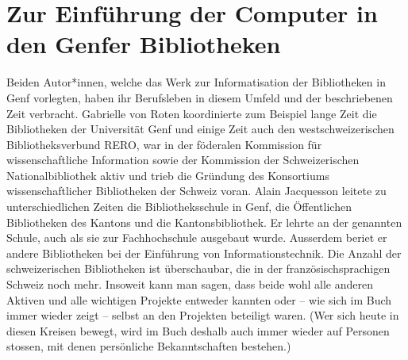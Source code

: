 \documentclass[a4paper,
fontsize=11pt,
oneside,
numbers=noperiodatend,
parskip=half-,
bibliography=totoc,
final
]{scrartcl}
\begin{document}
\hypertarget{zur-einfuxfchrung-der-computer-in-den-genfer-bibliotheken}{%
\section{Zur Einführung der Computer in den Genfer
Bibliotheken}\label{zur-einfuxfchrung-der-computer-in-den-genfer-bibliotheken}}

Beiden Autor*innen, welche das Werk zur Informatisation der Bibliotheken
in Genf vorlegten, haben ihr Berufsleben in diesem Umfeld und der
beschriebenen Zeit verbracht. Gabrielle von Roten koordinierte zum
Beispiel lange Zeit die Bibliotheken der Universität Genf und einige
Zeit auch den westschweizerischen Bibliotheksverbund RERO, war in der
föderalen Kommission für wissenschaftliche Information sowie der
Kommission der Schweizerischen Nationalbibliothek aktiv und trieb die
Gründung des Konsortiums wissenschaftlicher Bibliotheken der Schweiz
voran. Alain Jacquesson leitete zu unterschiedlichen Zeiten die
Bibliotheksschule in Genf, die Öffentlichen Bibliotheken des Kantons und
die Kantonsbibliothek. Er lehrte an der genannten Schule, auch als sie
zur Fachhochschule ausgebaut wurde. Ausserdem beriet er andere
Bibliotheken bei der Einführung von Informationstechnik. Die Anzahl der
schweizerischen Bibliotheken ist überschaubar, die in der
französischsprachigen Schweiz noch mehr. Insoweit kann man sagen, dass
beide wohl alle anderen Aktiven und alle wichtigen Projekte entweder
kannten oder -- wie sich im Buch immer wieder zeigt -- selbst an den
Projekten beteiligt waren. (Wer sich heute in diesen Kreisen bewegt,
wird im Buch deshalb auch immer wieder auf Personen stossen, mit denen
persönliche Bekanntschaften bestehen.)
\end{document}
